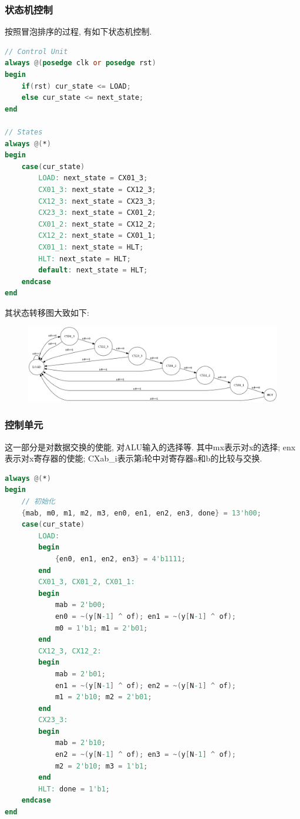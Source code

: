 \documentclass[UTF8]{article}
\begin{document}
\subsubsection{状态机控制}
按照冒泡排序的过程, 有如下状态机控制.
\begin{lstlisting}[language=verilog]
// Control Unit
always @(posedge clk or posedge rst)
begin
    if(rst) cur_state <= LOAD;
    else cur_state <= next_state;
end

// States
always @(*)
begin
    case(cur_state)
        LOAD: next_state = CX01_3;
        CX01_3: next_state = CX12_3;
        CX12_3: next_state = CX23_3;
        CX23_3: next_state = CX01_2;
        CX01_2: next_state = CX12_2;
        CX12_2: next_state = CX01_1;
        CX01_1: next_state = HLT;
        HLT: next_state = HLT;
        default: next_state = HLT;
    endcase
end
\end{lstlisting}
其状态转移图大致如下:
\begin{figure}[H]
	\centering
	\includegraphics[scale=0.3]{graph.png}
\end{figure}\par
\subsubsection{控制单元}
这一部分是对数据交换的使能, 对ALU输入的选择等. 其中mx表示对x的选择; enx表示对x寄存器的使能; CXab\_i表示第i轮中对寄存器a和b的比较与交换.
\begin{lstlisting}[language=verilog]
always @(*)
begin
    // 初始化
    {mab, m0, m1, m2, m3, en0, en1, en2, en3, done} = 13'h00;
    case(cur_state)
        LOAD:
        begin
            {en0, en1, en2, en3} = 4'b1111;
        end
        CX01_3, CX01_2, CX01_1:
        begin
            mab = 2'b00;
            en0 = ~(y[N-1] ^ of); en1 = ~(y[N-1] ^ of);
            m0 = 1'b1; m1 = 2'b01;
        end
        CX12_3, CX12_2:
        begin
            mab = 2'b01;
            en1 = ~(y[N-1] ^ of); en2 = ~(y[N-1] ^ of);
            m1 = 2'b10; m2 = 2'b01;
        end
        CX23_3:
        begin
            mab = 2'b10;
            en2 = ~(y[N-1] ^ of); en3 = ~(y[N-1] ^ of);
            m2 = 2'b10; m3 = 1'b1;
        end
        HLT: done = 1'b1;
    endcase
end
\end{lstlisting}
\end{document}
